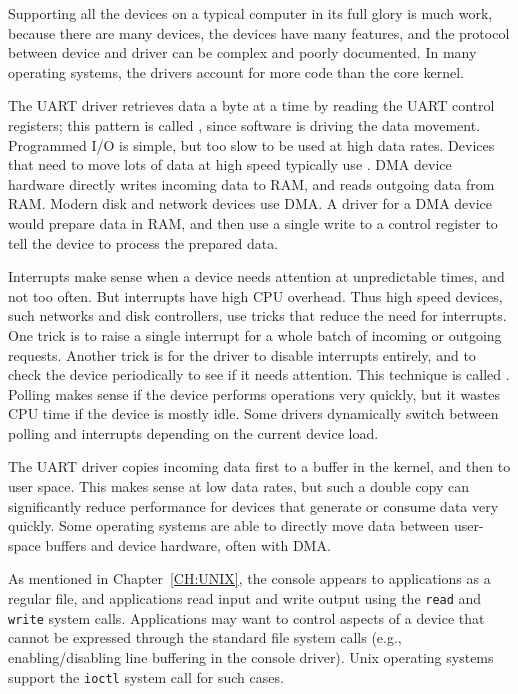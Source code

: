 Supporting all the devices on a typical computer in its full glory is
much work, because there are many devices, the devices have many
features, and the protocol between device and driver can be complex
and poorly documented. In many operating systems, the drivers account
for more code than the core kernel.

The UART driver retrieves data a byte at a time by reading the UART
control registers; this pattern is called , since
software is driving the data movement. Programmed I/O is simple, but
too slow to be used at high data rates. Devices that need to move lots
of data at high speed typically use .
DMA device hardware directly writes incoming data to RAM, and reads
outgoing data from RAM. Modern disk and network devices use DMA. A
driver for a DMA device would prepare data in RAM, and then use a
single write to a control register to tell the device to process the
prepared data.

Interrupts make sense when a device needs attention at unpredictable
times, and not too often. But interrupts have high CPU overhead. Thus
high speed devices, such networks and disk controllers, use tricks
that reduce the need for interrupts. One trick is to raise a single
interrupt for a whole batch of incoming or outgoing requests. Another
trick is for the driver to disable interrupts entirely, and to check
the device periodically to see if it needs attention. This technique
is called . Polling makes sense if the device performs
operations very quickly, but it wastes CPU time if the device is mostly
idle. Some drivers dynamically switch between polling and interrupts
depending on the current device load.

The UART driver copies incoming data first to a buffer in the kernel,
and then to user space. This makes sense at low data rates, but such a
double copy can significantly reduce performance for devices that
generate or consume data very quickly. Some operating systems are able
to directly move data between user-space buffers and device hardware,
often with DMA.

As mentioned in Chapter~\ref{CH:UNIX}, the console appears to
applications as a regular file, and applications read input and write
output using the \lstinline{read} and \lstinline{write} system calls.
Applications may want to control aspects of a device that cannot be
expressed through the standard file system calls (e.g.,
enabling/disabling line buffering in the console driver).  Unix
operating systems support the \lstinline{ioctl} system call for such
cases.

